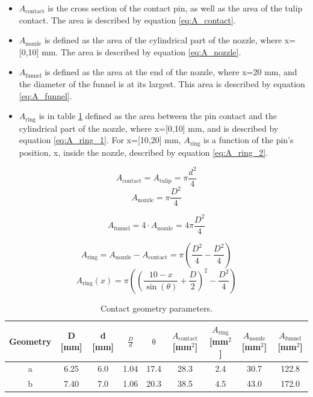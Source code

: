 \documentclass[10pt,a4paper,twoside]{article}
\begin{document}
\newpage
\begin{itemize}
\item $A_\mathrm{{contact}}$ is the cross section of the contact pin, as well as the area of the tulip contact. The area is described by equation \eqref{eq:A_contact}.

\item $A_\mathrm{{nozzle}}$ is defined as the area of the cylindrical part of the nozzle, where x=[0,10] mm. The area is described by equation \eqref{eq:A_nozzle}.

\item $A_\mathrm{{funnel}}$ is defined as the area at the end of the nozzle, where x=20 mm, and the diameter of the funnel is at its largest. This area is described by equation \eqref{eq:A_funnel}.

\item $A_\mathrm{{ring}}$ is in table \ref{tab:contGeoPara} defined as the area between the pin contact and the cylindrical part of the nozzle, where x=[0,10] mm, and is described by equation \eqref{eq:A_ring_1}. For x=[10,20] mm, $A_\mathrm{{ring}}$ is a function of the pin's position, x, inside the nozzle, described by equation \eqref{eq:A_ring_2}.
\end{itemize}

\begin{equation} \label{eq:A_contact}
A_\mathrm{{contact}}=A_\mathrm{{tulip}}=\pi \frac{d^2}{4}
\end{equation}
\begin{equation} \label{eq:A_nozzle}
A_\mathrm{{nozzle}}=\pi \frac{D^2}{4}
\end{equation}

\begin{equation} \label{eq:A_funnel}
A_\mathrm{{funnel}}=4 \cdot A_\mathrm{{nozzle}}=4\pi \frac{D^2}{4}
\end{equation}

\begin{equation} \label{eq:A_ring_1}
A_\mathrm{{ring}}=A_\mathrm{{nozzle}}-A_\mathrm{{contact}}=\pi\left( \frac{D^2}{4}-\frac{D^2}{4}\right)
\end{equation}
\begin{equation} \label{eq:A_ring_2}
A_\mathrm{{ring}}(x)=\pi\left( \left(\frac{10-x}{\sin (\theta)}+\frac{D}{2}\right)^2-\frac{D^2}{4}\right)
\end{equation}

\begin{table}[H]
\center
\caption{Contact geometry parameters.}
 \begin{tabular}{|c|c|c|c|c|c|c|c|c|}
\hline 
Geometry & D [mm] & d [mm] & $\frac{D}{d}$ & $\mathrm{\theta}$ & $A_\mathrm{{contact}}$ [mm$^2$] & $A_\mathrm{{ring}}$ [mm$^2$] & $A_\mathrm{{nozzle}}$ [mm$^2$] & $A_\mathrm{{funnel}}$ [mm$^2$]\\ 
\hline 
a & 6.25 & 6.0 & 1.04 & 17.4 & 28.3 & 2.4 & 30.7 & 122.8\\ 
\hline 
b & 7.40 & 7.0 & 1.06 & 20.3 & 38.5 & 4.5 & 43.0 & 172.0\\ 
\hline 
\end{tabular} 
\label{tab:contGeoPara}
\end{table}
\end{document}
